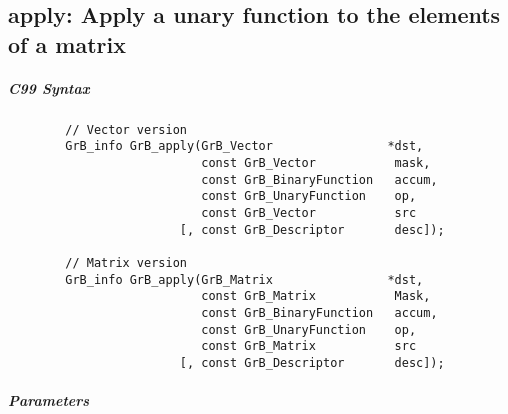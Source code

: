\subsection{{\sf apply}: Apply a unary function to the elements of a matrix}


\subparagraph{C99 Syntax}

\begin{verbatim}
        // Vector version
        GrB_info GrB_apply(GrB_Vector                *dst,
                           const GrB_Vector           mask,
                           const GrB_BinaryFunction   accum,
                           const GrB_UnaryFunction    op,
                           const GrB_Vector           src
                        [, const GrB_Descriptor       desc]);

        // Matrix version
        GrB_info GrB_apply(GrB_Matrix                *dst,
                           const GrB_Matrix           Mask,
                           const GrB_BinaryFunction   accum,
                           const GrB_UnaryFunction    op,
                           const GrB_Matrix           src
                        [, const GrB_Descriptor       desc]);
\end{verbatim}

\subparagraph{Parameters}

